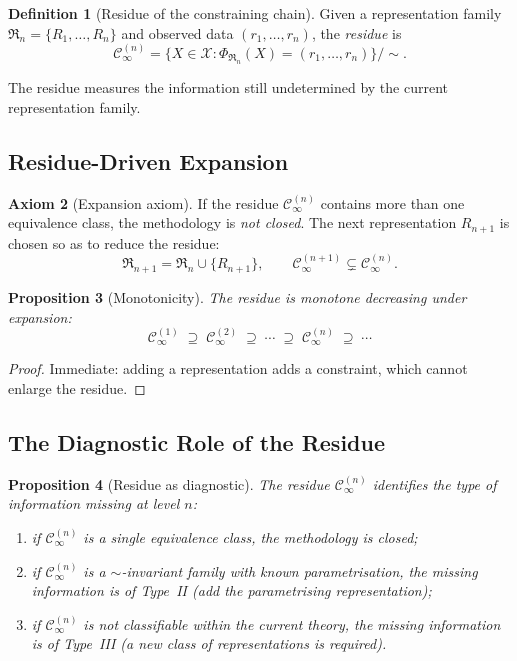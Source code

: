 \documentclass[11pt,a4paper]{article}
\theoremstyle{definition}
\newtheorem{definition}{Definition}[section]
\newtheorem{axiom}[definition]{Axiom}
\theoremstyle{plain}
\newtheorem{proposition}[definition]{Proposition}
\newcommand{\Ccal}{\mathcal{C}}
\newcommand{\Xcal}{\mathcal{X}}
\newcommand{\Rfrak}{\mathfrak{R}}
\newcommand{\Phimap}{\Phi}
\newcommand{\simadm}{\sim}
\begin{document}
\begin{definition}[Residue of the constraining chain]\label{def:residue}
Given a representation family $\Rfrak_n = \{R_1, \ldots, R_n\}$ and
observed data $(r_1, \ldots, r_n)$, the \emph{residue} is
\[
  \Ccal_\infty^{(n)}
  =
  \bigl\{ X \in \Xcal :
    \Phimap_{\Rfrak_n}(X) = (r_1, \ldots, r_n) \bigr\}
  \big/ \simadm .
\]
\end{definition}

The residue measures the information still undetermined by the
current representation family.

\subsection{Residue-Driven Expansion}

\begin{axiom}[Expansion axiom]\label{ax:expansion}
If the residue $\Ccal_\infty^{(n)}$ contains more than one
equivalence class, the methodology is \emph{not closed}. The next
representation $R_{n+1}$ is chosen so as to reduce the residue:
\[
  \Rfrak_{n+1} = \Rfrak_n \cup \{R_{n+1}\},
  \qquad
  \Ccal_\infty^{(n+1)} \subsetneq \Ccal_\infty^{(n)}.
\]
\end{axiom}

\begin{proposition}[Monotonicity]\label{prop:monotonicity}
The residue is monotone decreasing under expansion:
\[
  \Ccal_\infty^{(1)}
  \;\supseteq\;
  \Ccal_\infty^{(2)}
  \;\supseteq\;
  \cdots
  \;\supseteq\;
  \Ccal_\infty^{(n)}
  \;\supseteq\;
  \cdots
\]
\end{proposition}

\begin{proof}
Immediate: adding a representation adds a constraint, which cannot
enlarge the residue.
\end{proof}

\subsection{The Diagnostic Role of the Residue}

\begin{proposition}[Residue as diagnostic]\label{prop:residue-diagnostic}
The residue $\Ccal_\infty^{(n)}$ identifies the \emph{type} of
information missing at level $n$:
\begin{enumerate}[label=(\roman*)]
  \item if $\Ccal_\infty^{(n)}$ is a single equivalence class, the
        methodology is closed;
  \item if $\Ccal_\infty^{(n)}$ is a $\simadm$-invariant family with
        known parametrisation, the missing information is of
        Type~II (add the parametrising representation);
  \item if $\Ccal_\infty^{(n)}$ is not classifiable within the
        current theory, the missing information is of Type~III
        (a new class of representations is required).
\end{enumerate}
\end{proposition}
\end{document}
